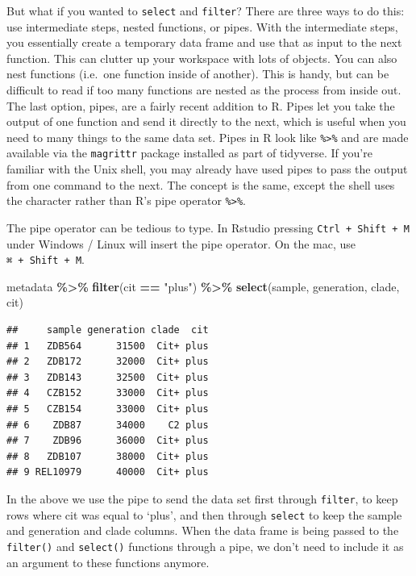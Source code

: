 \documentclass[
]{book}
\newenvironment{Shaded}{\begin{snugshade}}{\end{snugshade}}
\newcommand{\FunctionTok}[1]{\textcolor[rgb]{0.13,0.29,0.53}{\textbf{#1}}}
\newcommand{\NormalTok}[1]{#1}
\newcommand{\SpecialCharTok}[1]{\textcolor[rgb]{0.81,0.36,0.00}{\textbf{#1}}}
\newcommand{\StringTok}[1]{\textcolor[rgb]{0.31,0.60,0.02}{#1}}
\begin{document}
But what if you wanted to \texttt{select} and \texttt{filter}? There are three ways to do this: use intermediate steps, nested functions, or pipes. With the intermediate steps, you essentially create a temporary data frame and use that as input to the next function. This can clutter up your workspace with lots of objects. You can also nest functions (i.e.~one function inside of another). This is handy, but can be difficult to read if too many functions are nested as the process from inside out. The last option, pipes, are a fairly recent addition to R. Pipes let you take the output of one function and send it directly to the next, which is useful when you need to many things to the same data set. Pipes in R look like \texttt{\%\textgreater{}\%} and are made available via the \texttt{magrittr} package installed as part of tidyverse. If you're familiar with the Unix shell, you may already have used pipes to pass the output from one command to the next. The concept is the same, except the shell uses the \texttt{\textbar{}} character rather than R's pipe operator \texttt{\%\textgreater{}\%}.

The pipe operator can be tedious to type. In Rstudio pressing \texttt{Ctrl\ +\ Shift\ +\ M} under Windows / Linux will insert the pipe operator. On the mac, use \texttt{⌘\ +\ Shift\ +\ M}.

\begin{Shaded}
\begin{Highlighting}[]
\NormalTok{metadata }\SpecialCharTok{\%\textgreater{}\%}
  \FunctionTok{filter}\NormalTok{(cit }\SpecialCharTok{==} \StringTok{"plus"}\NormalTok{) }\SpecialCharTok{\%\textgreater{}\%}
  \FunctionTok{select}\NormalTok{(sample, generation, clade, cit)}
\end{Highlighting}
\end{Shaded}

\begin{verbatim}
##     sample generation clade  cit
## 1   ZDB564      31500  Cit+ plus
## 2   ZDB172      32000  Cit+ plus
## 3   ZDB143      32500  Cit+ plus
## 4   CZB152      33000  Cit+ plus
## 5   CZB154      33000  Cit+ plus
## 6    ZDB87      34000    C2 plus
## 7    ZDB96      36000  Cit+ plus
## 8   ZDB107      38000  Cit+ plus
## 9 REL10979      40000  Cit+ plus
\end{verbatim}

In the above we use the pipe to send the data set first through \texttt{filter}, to keep rows where cit was equal to `plus', and then through \texttt{select} to keep the sample and generation and clade columns. When the data frame is being passed to the \texttt{filter()} and \texttt{select()} functions through a pipe, we don't need to include it as an argument to these functions anymore.
\end{document}
